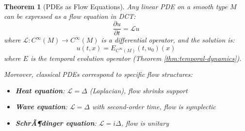 \documentclass[11pt]{article}
\newtheorem{theorem}{Theorem}[section]
\theoremstyle{definition}
\begin{document}
\begin{theorem}[PDEs as Flow Equations]
\label{thm:pde-flows}
Any linear PDE on a smooth type $M$ can be expressed as a flow equation in DCT:
\[
\frac{\partial u}{\partial t} = \mathcal{L}u
\]
where $\mathcal{L} : C^\infty(M) \to C^\infty(M)$ is a differential operator, and the solution is:
\[
u(t, x) = E_{C^\infty(M)}(t, u_0)(x)
\]
where $E$ is the temporal evolution operator (Theorem \ref{thm:temporal-dynamics}).

Moreover, classical PDEs correspond to specific flow structures:
\begin{itemize}
\item \textbf{Heat equation}: $\mathcal{L} = \Delta$ (Laplacian), flow shrinks support
\item \textbf{Wave equation}: $\mathcal{L} = \Delta$ with second-order time, flow is symplectic
\item \textbf{SchrÃ¶dinger equation}: $\mathcal{L} = i\Delta$, flow is unitary
\end{itemize}
\end{theorem}
\end{document}
